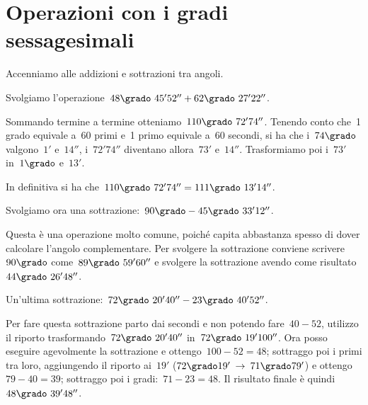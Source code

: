 \ovalbox{\risolvii \ref{ese:C.3}, \ref{ese:C.4}, \ref{ese:C.5}}

\section{Operazioni con i gradi sessagesimali}

Accenniamo alle addizioni e sottrazioni tra angoli.

\begin{exrig}
 \begin{esempio}
Svolgiamo l'operazione~$48\grado~45' 52'' + 62\grado~27' 22''$.
\begin{center}
 
\end{center}

Sommando termine a termine otteniamo~$110\grado~72' 74''$. Tenendo conto che~1 grado equivale a~60 primi e~1 primo equivale a~60 secondi,
si ha che i~$74\grado$ valgono~$1'$ e~$14''$, i~$72' 74''$ diventano allora~$73'$ e~$14''$.
Trasformiamo poi i~$73'$ in~$1\grado$ e~$13'$.

In definitiva si ha che~$110\grado~72' 74'' = 111\grado~13' 14''$.
 \end{esempio}

 \begin{esempio}
Svolgiamo ora una sottrazione:~$90\grado - 45\grado~33' 12''$.
\begin{center}
 
\end{center}

Questa è una operazione molto comune, poiché capita abbastanza spesso di dover calcolare l'angolo complementare.
Per svolgere la sottrazione conviene scrivere~$90\grado$ come~$89\grado~59' 60''$ e svolgere la sottrazione avendo come risultato~$44\grado~26' 48''$.
 \end{esempio}

 \begin{esempio}
Un'ultima sottrazione:~$72\grado~20' 40'' - 23\grado~40' 52''$.

Per fare questa sottrazione parto dai secondi e non potendo fare~$40-52$, utilizzo il riporto trasformando~$72\grado~20' 40''$
in~$72\grado~19' 100''$. Ora posso eseguire agevolmente la sottrazione e ottengo~$100-52=48$;
sottraggo poi i primi tra loro, aggiungendo il riporto ai~$19'$ ($72\grado 19' \:\rightarrow\: 71\grado 79'$) e ottengo~$79-40=39$; sottraggo poi i gradi:~$71-23=48$.
Il risultato finale è quindi~$48\grado~39' 48''$.
 \end{esempio}
\end{exrig}

